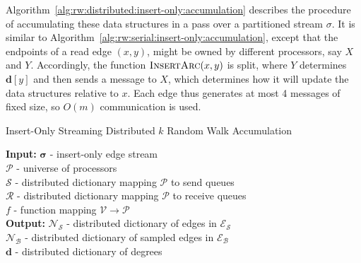 \documentclass{report}
\newcommand{\algoname}[1]{\textnormal{\textsc{#1}}}
\begin{document}
Algorithm~\ref{alg:rw:distributed:insert-only:accumulation} describes the procedure of accumulating these data structures in a pass over a partitioned stream $\sigma$.
It is similar to Algorithm~\ref{alg:rw:serial:insert-only:accumulation}, except that the endpoints of a read edge $(x, y)$, might be owned by different processors, say $X$ and $Y$.
Accordingly, the function $\algoname{InsertArc}(x,y)$ is split, where $Y$ determines $\mathbf{d}[y]$ and then sends a message to $X$, which determines how it will update the data structures relative to $x$. 
Each edge thus generates at most 4 messages of fixed size, so $O(m)$ communication is used.


\begin{algorithm}[htbp] 
\caption{Insert-Only Streaming Distributed $k$ Random Walk Accumulation}\label{alg:rw:distributed:insert-only:accumulation}
\begin{flushleft}
        \textbf{Input:} 		$\boldsymbol{\sigma}$ - insert-only edge stream\\
        	\hspace{3.2em}	$\mathcal{P}$ - universe of processors	 \\
        	\hspace{3.2em}	$\mathcal{S}$ - distributed dictionary mapping $\mathcal{P}$ to send queues	 \\
        	\hspace{3.2em}	$\mathcal{R}$ - distributed dictionary mapping $\mathcal{P}$ to receive queues	 \\
        	\hspace{3.2em}	$f$ - function mapping $\mathcal{V} \rightarrow \mathcal{P}$	 \\
        \textbf{Output:} $\mathcal{N}_\mathcal{S}$ - distributed dictionary of edges in $\mathcal{E}_\mathcal{S}$ \\
        	\hspace{4.05em}	$\mathcal{N}_\mathcal{B}$ - distributed dictionary of sampled edges in $\mathcal{E}_\mathcal{B}$ \\
        	\hspace{4.05em}	$\mathbf{d}$ - distributed dictionary of degrees
\end{flushleft}
\begin{flushleft}

\end{flushleft}
\end{algorithm}
\end{document}
